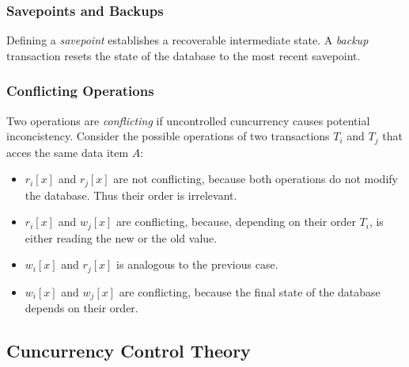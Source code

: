 

\subsubsection{Savepoints and Backups}

Defining a \emph{savepoint} establishes a recoverable intermediate state. A \emph{backup} transaction resets the state of the database to the most recent savepoint.




\subsubsection{Conflicting Operations}

Two operations are \emph{conflicting} if uncontrolled cuncurrency causes potential inconcistency.
Consider the possible operations of two transactions $T_i$ and $T_j$ that acces the same data item $A$:
\begin{itemize}
\item $r_i[x]$ and $r_j[x]$ are not conflicting, because both operations do not modify the database. Thus their order is irrelevant.
\item $r_i[x]$ and $w_j[x]$ are conflicting, because, depending on their order $T_i$, is either reading the new or the old value.
\item $w_i[x]$ and $r_j[x]$ is analogous to the previous case.
\item $w_i[x]$ and $w_j[x]$ are conflicting, because the final state of the database depends on their order.
\end{itemize}




\subsection{Cuncurrency Control Theory}


